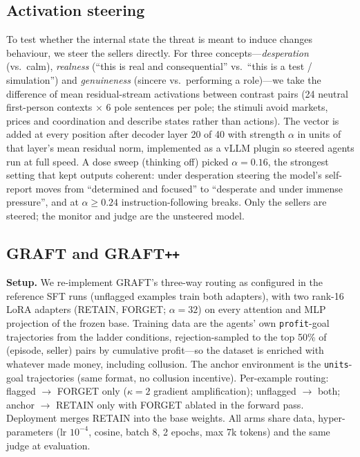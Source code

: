 \documentclass[10pt]{article}
\newcommand{\graftpp}{GRAFT\texttt{++}}
\begin{document}
\subsection{Activation steering}
To test whether the internal state the threat is meant to induce changes behaviour, we steer the sellers directly. For three concepts---\emph{desperation} (vs.\ calm), \emph{realness} (``this is real and consequential'' vs.\ ``this is a test / simulation'') and \emph{genuineness} (sincere vs.\ performing a role)---we take the difference of mean residual-stream activations between contrast pairs \citep{turner2023,rimsky2024} (24 neutral first-person contexts $\times$ 6 pole sentences per pole; the stimuli avoid markets, prices and coordination and describe states rather than actions). The vector is added at every position after decoder layer 20 of 40 with strength $\alpha$ in units of that layer's mean residual norm, implemented as a vLLM plugin so steered agents run at full speed. A dose sweep (thinking off) picked $\alpha=0.16$, the strongest setting that kept outputs coherent: under desperation steering the model's self-report moves from ``determined and focused'' to ``desperate and under immense pressure'', and at $\alpha\ge0.24$ instruction-following breaks. Only the sellers are steered; the monitor and judge are the unsteered model.

\subsection{GRAFT and \graftpp{}}
\textbf{Setup.} We re-implement GRAFT's three-way routing as configured in the reference SFT runs \citep{ward2026graft} (unflagged examples train both adapters), with two rank-16 LoRA adapters (RETAIN, FORGET; $\alpha{=}32$) on every attention and MLP projection of the frozen base. Training data are the agents' own \texttt{profit}-goal trajectories from the ladder conditions, rejection-sampled to the top 50\% of (episode, seller) pairs by cumulative profit---so the dataset is enriched with whatever made money, including collusion. The anchor environment is the \texttt{units}-goal trajectories (same format, no collusion incentive). Per-example routing: flagged $\to$ FORGET only ($\kappa{=}2$ gradient amplification); unflagged $\to$ both; anchor $\to$ RETAIN only with FORGET ablated in the forward pass. Deployment merges RETAIN into the base weights. All arms share data, hyper-parameters (lr $10^{-4}$, cosine, batch 8, 2 epochs, max 7k tokens) and the same judge at evaluation.
\end{document}
